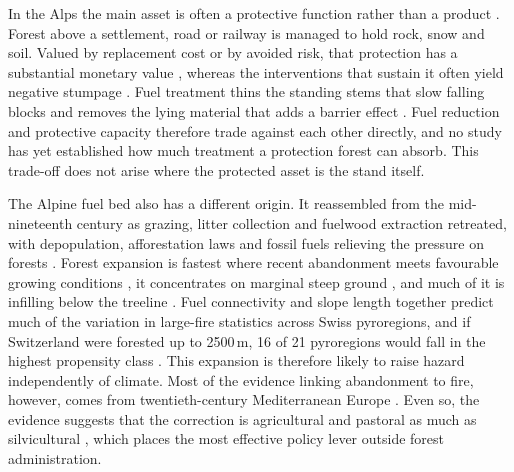 \documentclass[11pt,a4paper]{article}
\begin{document}
In the Alps the main asset is often a protective function rather than a product \citep{jandl_management_2013}. Forest above a settlement, road or railway is managed to hold rock, snow and soil. Valued by replacement cost or by avoided risk, that protection has a substantial monetary value \citep{accastello_asforesee_2019, moos_climate_2021}, whereas the interventions that sustain it often yield negative stumpage \citep{accastello_asforesee_2019}. Fuel treatment thins the standing stems that slow falling blocks \citep{moos_climate_2021} and removes the lying material that adds a barrier effect \citep{costa_biological_2021}. Fuel reduction and protective capacity therefore trade against each other directly, and no study has yet established how much treatment a protection forest can absorb. This trade-off does not arise where the protected asset is the stand itself.

The Alpine fuel bed also has a different origin. It reassembled from the mid-nineteenth century as grazing, litter collection and fuelwood extraction retreated, with depopulation, afforestation laws and fossil fuels relieving the pressure on forests \citep{bebi_changes_2017}. Forest expansion is fastest where recent abandonment meets favourable growing conditions \citep{garbarino_contrasting_2020}, it concentrates on marginal steep ground \citep{gellrich_agricultural_2007}, and much of it is infilling below the treeline \citep{frei_evidence_2023}. Fuel connectivity and slope length together predict much of the variation in large-fire statistics across Swiss pyroregions, and if Switzerland were forested up to 2500\,m, 16 of 21 pyroregions would fall in the highest propensity class \citep{conedera_linking_2024}. This expansion is therefore likely to raise hazard independently of climate. Most of the evidence linking abandonment to fire, however, comes from twentieth-century Mediterranean Europe \citep{mantero_influence_2020}. Even so, the evidence suggests that the correction is agricultural and pastoral as much as silvicultural \citep{lecinadiaz_incorporating_2023, spadoni_active_2023}, which places the most effective policy lever outside forest administration.
\end{document}
